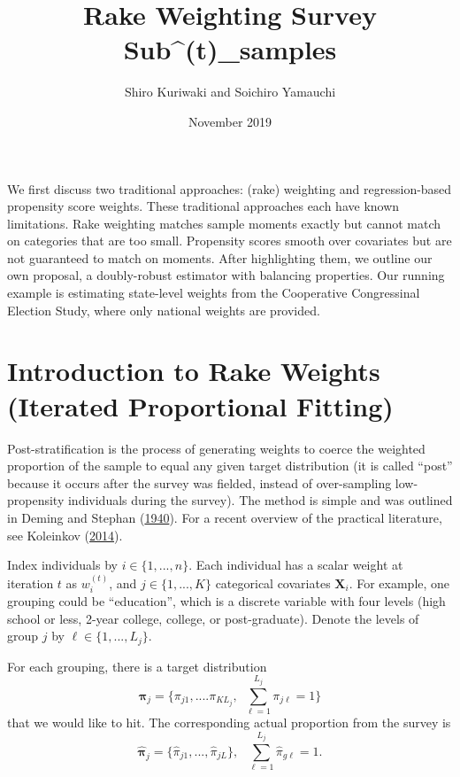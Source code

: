 \documentclass[11pt]{article}
\title{\Large\textbf{Rake Weighting Survey Sub^{(t)}_samples}}
\author{\normalsize Shiro Kuriwaki and Soichiro Yamauchi}
\date{\normalsize November 2019}
\begin{document}
\maketitle


We first discuss two traditional approaches: (rake) weighting and regression-based propensity score weights. These traditional approaches each have known limitations. Rake weighting matches sample moments exactly but cannot match on categories that are too small. Propensity scores smooth over covariates but are not guaranteed to match on moments.  After highlighting them, we outline our own proposal, a doubly-robust estimator with balancing properties. Our running example is estimating state-level weights from the Cooperative Congressinal Election Study, where only national weights are provided.

\section{Introduction to Rake Weights (Iterated Proportional Fitting)}

Post-stratification is the process of generating weights to coerce the weighted proportion of the sample to equal any given target distribution (it is called ``post'' because it occurs after the survey was fielded, instead of over-sampling low-propensity individuals during the survey). The method is simple and was outlined in Deming and Stephan (\href{https://projecteuclid.org/download/pdf_1/euclid.aoms/1177731829}{1940}). For a recent overview of the practical literature, see Koleinkov (\href{https://journals-sagepub-com.ezp-prod1.hul.harvard.edu/doi/pdf/10.1177/1536867X1401400104}{2014}).

Index individuals by \(i \in \{1, ..., n\}\). Each individual has a scalar weight at iteration \(t\) as \(w^{(t)}_i\), and \(j \in \{1, ..., K\}\) categorical covariates \(\bm{X}_i\). For example, one grouping could be ``education'', which is a discrete variable with four levels (high school or less, 2-year college, college, or post-graduate). Denote the levels of group \(j\) by \(\ell \in \{1, ..., L_j\}\). 

For each grouping, there is a target distribution \[\bm{\pi}_j = \{\pi_{j1}, .... \pi_{KL_j}, ~~ \sum^{L_{j}}_{\ell = 1}\pi_{j\ell} = 1\}\] that we would like to hit. The corresponding actual proportion from the survey is \[\widehat{\bm{\pi}}_j = \{\widehat{\pi}_{j1},  ..., \widehat{\pi}_{jL}\}, ~~~\sum^{L_{j}}_{\ell = 1}\widehat{\pi}_{g\ell} = 1.\]
\end{document}
